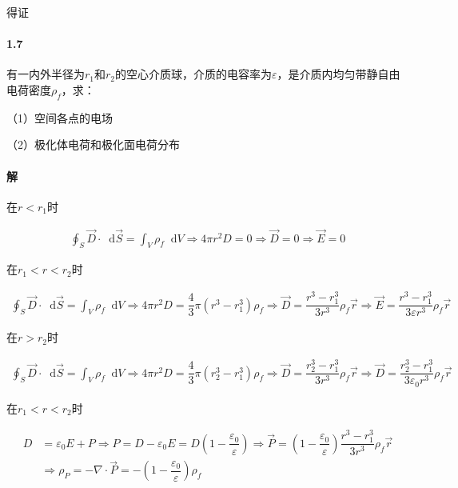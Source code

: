 \documentclass{article}
\newcommand*{\md}{\mathop{}\!\mathrm{d}}
\begin{document}
得证

\paragraph{1.7}

有一内外半径为$r_1$和$r_2$的空心介质球，介质的电容率为$\varepsilon$，是介质内均匀带静自由电荷密度$\rho_f$，求：

（1）空间各点的电场

（2）极化体电荷和极化面电荷分布

\paragraph{解}

在$r < r_1$时

\begin{equation*}
  \begin{aligned}
    \oint_S \vec{D} \cdot \md \vec{S} = \int_V \rho_f \md V
    \Rightarrow
    4\pi r^2 D = 0
    \Rightarrow
    \vec{D} = 0
    \Rightarrow
    \vec{E} = 0
  \end{aligned}
\end{equation*}

在$r_1 < r < r_2$时

\begin{equation*}
  \begin{aligned}
    \oint_S \vec{D} \cdot \md \vec{S} = \int_V \rho_f \md V
    \Rightarrow
    4\pi r^2 D = \dfrac{4}{3} \pi \left( r^3 - r_1^3 \right) \rho_f
    \Rightarrow
    \vec{D} = \dfrac{r^3 - r_1^3}{3 r^3} \rho_f \vec{r} 
    \Rightarrow
    \vec{E} = \dfrac{r^3 - r_1^3}{3 \varepsilon r^3} \rho_f \vec{r}
  \end{aligned}
\end{equation*}

在$r > r_2$时

\begin{equation*}
  \begin{aligned}
    \oint_S \vec{D} \cdot \md \vec{S} = \int_V \rho_f \md V
    \Rightarrow
    4\pi r^2 D = \dfrac{4}{3} \pi \left( r_2^3 - r_1^3 \right) \rho_f
    \Rightarrow
    \vec{D} = \dfrac{r_2^3 - r_1^3}{3 r^3} \rho_f \vec{r}
    \Rightarrow
    \vec{D} = \dfrac{r_2^3 - r_1^3}{3 \varepsilon_0 r^3} \rho_f \vec{r}
  \end{aligned}
\end{equation*}

在$r_1 <r < r_2$时

\begin{equation*}
  \begin{aligned}
    D &= \varepsilon_0 E + P
    \Rightarrow
    P = D - \varepsilon_0 E = D \left( 1 - \dfrac{\varepsilon_0}{\varepsilon}  \right)
    \Rightarrow
    \vec{P} = \left( 1 - \dfrac{\varepsilon_0}{\varepsilon}  \right) \dfrac{r^3 - r_1^3}{3r^3} \rho_f \vec{r} \\
    &\Rightarrow
    \rho_P = - \nabla \cdot \vec{P} = - \left( 1 - \dfrac{\varepsilon_0}{\varepsilon}  \right) \rho_f
  \end{aligned}
\end{equation*}
\end{document}
